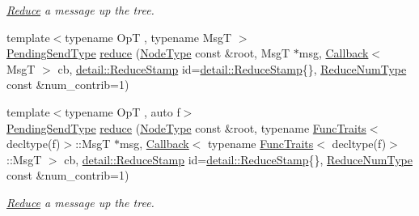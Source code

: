 \begin{DoxyCompactItemize}
\begin{DoxyCompactList}\small\item\em \hyperlink{structvt_1_1collective_1_1reduce_1_1_reduce}{Reduce} a message up the tree. \end{DoxyCompactList}\item 
{\footnotesize template$<$typename OpT , typename MsgT $>$ }\\\hyperlink{structvt_1_1collective_1_1reduce_1_1_reduce_a0474b491f3c93014d9a0ce0356c6bfd5}{Pending\+Send\+Type} \hyperlink{structvt_1_1collective_1_1reduce_1_1_reduce_a381010aca8dc21470b35b6e4604ca6f0}{reduce} (\hyperlink{namespacevt_a866da9d0efc19c0a1ce79e9e492f47e2}{Node\+Type} const \&root, MsgT $\ast$msg, \hyperlink{namespacevt_a57b238783d05de96bc2c4027f7073b7f}{Callback}$<$ MsgT $>$ cb, \hyperlink{namespacevt_1_1collective_1_1reduce_1_1detail_aacc1fcd729d934ba143fee3a943bf9e7}{detail\+::\+Reduce\+Stamp} id=\hyperlink{namespacevt_1_1collective_1_1reduce_1_1detail_aacc1fcd729d934ba143fee3a943bf9e7}{detail\+::\+Reduce\+Stamp}\{\}, \hyperlink{structvt_1_1collective_1_1reduce_1_1_reduce_a6c3e63aca10c31d2823b0b18cf9762a4}{Reduce\+Num\+Type} const \&num\+\_\+contrib=1)
\item 
{\footnotesize template$<$typename OpT , auto f$>$ }\\\hyperlink{structvt_1_1collective_1_1reduce_1_1_reduce_a0474b491f3c93014d9a0ce0356c6bfd5}{Pending\+Send\+Type} \hyperlink{structvt_1_1collective_1_1reduce_1_1_reduce_a715bd2de0a6af6294657cf684291228f}{reduce} (\hyperlink{namespacevt_a866da9d0efc19c0a1ce79e9e492f47e2}{Node\+Type} const \&root, typename \hyperlink{structvt_1_1_func_traits}{Func\+Traits}$<$ decltype(f)$>$\+::MsgT $\ast$msg, \hyperlink{namespacevt_a57b238783d05de96bc2c4027f7073b7f}{Callback}$<$ typename \hyperlink{structvt_1_1_func_traits}{Func\+Traits}$<$ decltype(f)$>$\+::MsgT $>$ cb, \hyperlink{namespacevt_1_1collective_1_1reduce_1_1detail_aacc1fcd729d934ba143fee3a943bf9e7}{detail\+::\+Reduce\+Stamp} id=\hyperlink{namespacevt_1_1collective_1_1reduce_1_1detail_aacc1fcd729d934ba143fee3a943bf9e7}{detail\+::\+Reduce\+Stamp}\{\}, \hyperlink{structvt_1_1collective_1_1reduce_1_1_reduce_a6c3e63aca10c31d2823b0b18cf9762a4}{Reduce\+Num\+Type} const \&num\+\_\+contrib=1)
\begin{DoxyCompactList}\small\item\em \hyperlink{structvt_1_1collective_1_1reduce_1_1_reduce}{Reduce} a message up the tree. \end{DoxyCompactList}\item 

\end{DoxyCompactItemize}
